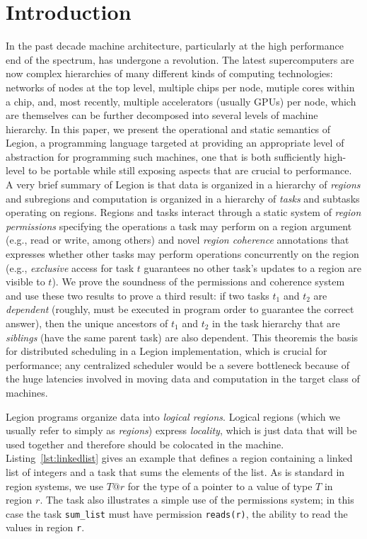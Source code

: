 
\section{Introduction}
\label{sec:intro}

In the past decade machine architecture, particularly at the high
performance end of the spectrum, has undergone a revolution.  The
latest supercomputers are now complex hierarchies of many different
kinds of computing technologies: networks of nodes at the top level,
multiple chips per node, mutiple cores within a chip, and, most
recently, multiple accelerators (usually GPUs) per node, which are
themselves can be further decomposed into several levels of machine
hierarchy.  In this paper, we present the operational and static
semantics of Legion, a programming language targeted at providing an
appropriate level of abstraction for programming such machines, one
that is both sufficiently high-level to be portable while still
exposing aspects that are crucial to performance. A very brief summary
of Legion is that data is organized in a hierarchy of {\em regions}
and subregions and computation is organized in a hierarchy of {\em
tasks} and subtasks operating on regions.  Regions and tasks interact
through a static system of {\em region permissions} specifying the
operations a task may perform on a region argument (e.g., read or
write, among others) and novel {\em region coherence} annotations that
expresses whether other tasks may perform operations concurrently on
the region (e.g., {\em exclusive} access for task $t$ guarantees no
other task's updates to a region are visible to $t$).  We prove the
soundness of the permissions and coherence system and use these two
results to prove a third result: if two tasks $t_1$ and $t_2$ are {\em
dependent} (roughly, must be executed in program order to guarantee
the correct answer), then the unique ancestors of $t_1$ and $t_2$ in
the task hierarchy that are {\em siblings} (have the same parent task)
are also dependent.  This theoremis the basis for distributed
scheduling in a Legion implementation, which is crucial for
performance; any centralized scheduler would be a severe bottleneck
because of the huge latencies involved in moving data and computation
in the target class of machines.

Legion programs organize data into {\em logical regions}.  Logical
regions (which we usually refer to simply as {\em regions}) express
{\em locality}, which is just data that will be used together and
therefore should be colocated in the machine.
Listing~\ref{lst:linkedlist} gives an example that defines a region
containing a linked list of integers and a task that sums the elements
of the list.  As is standard in region systems, we use $T @ r$ for the
type of a pointer to a value of type $T$ in region $r$.  The task also
illustrates a simple use of the permissions system; in this case the
task {\tt sum\_list} must have permission {\tt reads(r)}, the ability
to read the values in region {\tt r}.


